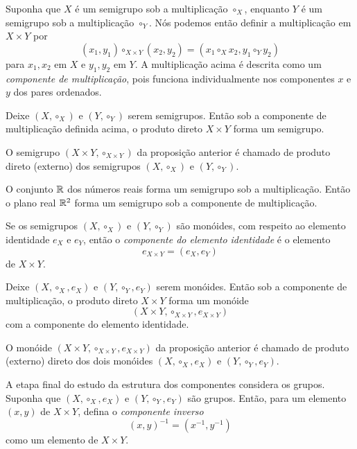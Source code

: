 Suponha que $X$ é um semigrupo sob a multiplicação $\circ_{X}$, enquanto $Y$ é um semigrupo sob a multiplicação $\circ_{Y}$. Nós podemos então definir a multiplicação em $X\times Y$ por
$$(x_{1},y_{1})\circ_{X\times Y} (x_{2},y_{2}) = (x_{1}\circ_{X}x_{2}, y_{1}\circ_{Y}y_{2})$$ para $x_{1},x_{2}$ em $X$ e $y_{1},y_{2}$ em $Y$. A multiplicação acima é descrita como um \emph{componente de multiplicação}, pois funciona individualmente nos componentes $x$ e $y$ dos pares ordenados.

\begin{stat}
  Deixe $(X, \circ_{X})$ e $(Y, \circ_{Y})$ serem semigrupos. Então sob a componente de multiplicação definida acima, o produto direto $X\times Y$ forma um semigrupo.
\end{stat}
\begin{definition}
  O semigrupo $(X\times Y, \circ_{X\times Y})$ da proposição anterior é chamado de produto direto (externo) dos semigrupos $(X, \circ_{X})$ e $(Y,\circ_{Y})$.
\end{definition}
\begin{exmp}
  O conjunto $\mathbb{R}$ dos números reais forma um semigrupo sob a multiplicação. Então o plano real $\mathbb{R}^{2}$ forma um semigrupo sob a componente de multiplicação.
\end{exmp}
Se os semigrupos $(X, \circ_{X})$ e $(Y, \circ_{Y})$ são monóides, com respeito ao elemento identidade $e_{X}$ e $e_{Y}$, então o \emph{componente do elemento identidade} é o elemento
$$e_{X\times Y} = (e_{X},e_{Y})$$ de $X\times Y$.

\begin{stat}
  Deixe $(X, \circ_{X}, e_{X})$ e $(Y, \circ_{Y}, e_{Y})$ serem monóides. Então sob a componente de multiplicação, o produto direto $X\times Y$ forma um monóide
  $$(X\times Y, \circ_{X\times Y}, e_{X\times Y})$$ com a componente do elemento identidade.
\end{stat}
\begin{definition}
  O monóide $(X\times Y, \circ_{X\times Y}, e_{X\times Y})$ da proposição anterior é chamado de produto (externo) direto dos dois monóides $(X, \circ_{X}, e_{X})$ e $(Y, \circ_{Y}, e_{Y})$.
\end{definition}
A etapa final do estudo da estrutura dos componentes considera os grupos. Suponha que $(X, \circ_{X}, e_{X})$ e $(Y, \circ_{Y}, e_{Y})$ são grupos. Então, para um elemento $(x,y)$ de $X\times Y$, defina o \emph{componente inverso} $$(x,y)^{-1} = (x^{-1},y^{-1})$$ como um elemento de $X\times Y$.

